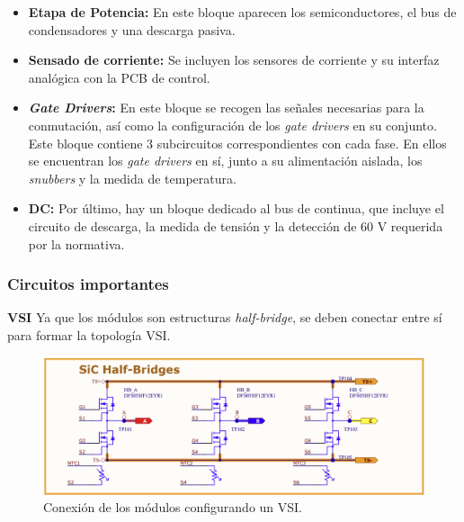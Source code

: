 \begin{itemize}
	
	\item \textbf{Etapa de Potencia:} En este bloque aparecen los semiconductores, el bus de condensadores y una descarga pasiva.
	
	\item \textbf{Sensado de corriente:} Se incluyen los sensores de corriente y su interfaz analógica con la PCB de control.
			
	\item \textbf{\textit{Gate Drivers}:} En este bloque se recogen las señales necesarias para la conmutación, así como la configuración de los \textit{gate drivers} en su conjunto. Este bloque contiene 3 subcircuitos correspondientes con cada fase. En ellos se encuentran los \textit{gate drivers} en sí, junto a su alimentación aislada, los \textit{snubbers} y la medida de temperatura.
		
	\item \textbf{DC:} Por último, hay un bloque dedicado al bus de continua, que incluye el circuito de descarga, la medida de tensión y la detección de 60 V requerida por la normativa.
\end{itemize}

\subsubsection{Circuitos importantes}

\textbf{VSI}
Ya que los módulos son estructuras \textit{half-bridge}, se deben conectar entre sí para formar la topología VSI.
\begin{figure}[H]
	\centering
	\includegraphics[width=0.7\linewidth]{fig/VSI-shc}
	\caption{Conexión de los módulos configurando un VSI.}
\end{figure}

